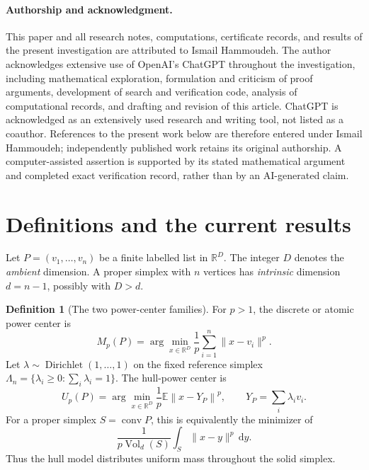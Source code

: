 \documentclass[11pt]{article}
\theoremstyle{definition}
\newtheorem{definition}[theorem]{Definition}
\newcommand{\R}{\mathbb R}
\newcommand{\E}{\mathbb E}
\newcommand{\conv}{\operatorname{conv}}
\newcommand{\Vol}{\operatorname{Vol}}
\newcommand{\Dir}{\operatorname{Dirichlet}}
\newcommand{\dd}{\,\mathrm d}
\begin{document}
\paragraph{Authorship and acknowledgment.}
This paper and all research notes, computations, certificate records, and
results of the present investigation are attributed to Ismail Hammoudeh.
The author acknowledges extensive use of OpenAI's ChatGPT throughout the
investigation, including mathematical exploration, formulation and
criticism of proof arguments, development of search and verification code,
analysis of computational records, and drafting and revision of this
article. ChatGPT is acknowledged as an extensively used research and
writing tool, not listed as a coauthor. References to the present work
below are therefore entered under Ismail Hammoudeh; independently published
work retains its original authorship. A computer-assisted assertion is
supported by its stated mathematical argument and completed exact
verification record, rather than by an AI-generated claim.

\clearpage
\begingroup
\fontsize{9.5}{10.7}\selectfont
\tableofcontents
\endgroup
\clearpage

\section{Definitions and the current results}
Let $P=(v_1,\ldots,v_n)$ be a finite labelled list in $\R^D$. The integer $D$
denotes the \emph{ambient} dimension. A proper simplex with $n$ vertices has
\emph{intrinsic} dimension $d=n-1$, possibly with $D>d$.

\begin{definition}[The two power-center families]
For $p>1$, the discrete or atomic power center is
\begin{equation}\label{eq:atomic}
 M_p(P)=\arg\min_{x\in\R^D}\frac1p\sum_{i=1}^n\|x-v_i\|^p.
\end{equation}
Let $\lambda\sim\Dir(1,\ldots,1)$ on the fixed reference simplex
$\Lambda_n=\{\lambda_i\ge0:\sum_i\lambda_i=1\}$. The hull-power center is
\begin{equation}\label{eq:hull}
 U_p(P)=\arg\min_{x\in\R^D}\frac1p\E\left\|x-Y_P\right\|^p,
 \qquad Y_P=\sum_i\lambda_i v_i.
\end{equation}
For a proper simplex $S=\conv P$, this is equivalently the minimizer of
\begin{equation}\label{eq:solid}
 \frac1{p\Vol_d(S)}\int_S\|x-y\|^p\dd y.
\end{equation}
Thus the hull model distributes uniform mass throughout the solid simplex.
\end{definition}
\end{document}
